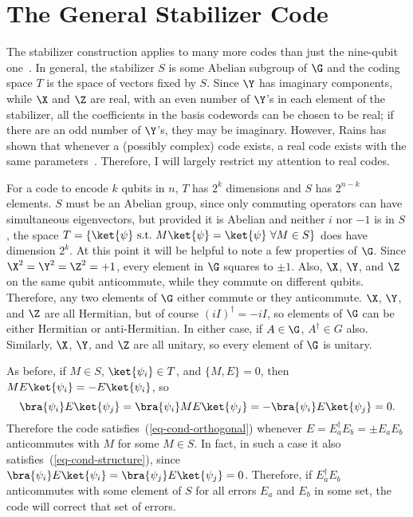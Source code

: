 \section{The General Stabilizer Code}

The stabilizer construction applies to many more codes than just the
nine-qubit one~\cite{gottesman-stab,calderbank-stab}.  In general, the
stabilizer $S$ is some Abelian subgroup of $\G$ and the coding space $T$ is
the space of vectors fixed by $S$.  Since $\Y$ has imaginary components,
while $\X$ and $\Z$ are real, with an even number of $\Y$'s in each element
of the stabilizer, all the coefficients in the basis codewords can be chosen
to be real; if there are an odd number of $\Y$'s, they may be imaginary.
However, Rains has shown that whenever a (possibly complex) code exists, a
real code exists with the same parameters~\cite{rains-shadow}.  Therefore, I
will largely restrict my attention to real codes.

For a code to encode $k$ qubits in $n$, $T$ has $2^k$ dimensions and $S$
has $2^{n-k}$ elements.  $S$ must be an Abelian group, since only
commuting operators can have simultaneous eigenvectors, but provided it
is Abelian and neither $i$ nor $-1$ is in $S$, the space $T = \{ \ket{\psi}\
	{\rm s.t.} \ M \ket{\psi} = \ket{\psi} \ \forall M \in S \}$ does have
dimension $2^k$.  At this point it will be helpful to note a few properties of
$\G$.  Since $\X^2 = \Y^2 = \Z^2 = +1$, every element in $\G$ squares to
$\pm 1$.  Also, $\X$, $\Y$, and $\Z$ on the same qubit anticommute, while
they commute on different qubits.  Therefore, any two elements of $\G$
either commute or they anticommute.  $\X$, $\Y$, and $\Z$ are all
Hermitian, but of course $(iI)^\dagger = -i I$, so elements of $\G$ can be
either Hermitian or anti-Hermitian.  In either case, if $A \in \G$,
$A^\dagger \in G$ also.  Similarly, $\X$, $\Y$, and $\Z$ are all unitary, so
every element of $\G$ is unitary.

As before, if $M \in S$, $\ket{\psi_i} \in T$, and $\{M, E \} = 0$, then
$M E \ket{\psi_i} =- E \ket{\psi_i}$, so
\begin{equation}
	\bra{\psi_i} E \ket{\psi_j} = \bra{\psi_i} M E \ket{\psi_j} = - \bra{\psi_i} E
	\ket{\psi_j} = 0.
\end{equation}
Therefore the code satisfies~(\ref{eq-cond-orthogonal}) whenever $E =
E_a^\dagger E_b = \pm E_a E_b$ anticommutes with $M$ for some $M \in
S$.  In fact, in such a case it also satisfies~(\ref{eq-cond-structure}), since
$\bra{\psi_i} E \ket{\psi_i} = \bra{\psi_j} E \ket{\psi_j} = 0$.  Therefore, if
$E_a^\dagger E_b$ anticommutes with some element of $S$ for all errors
$E_a$ and $E_b$ in some set, the code will correct that set of errors.

